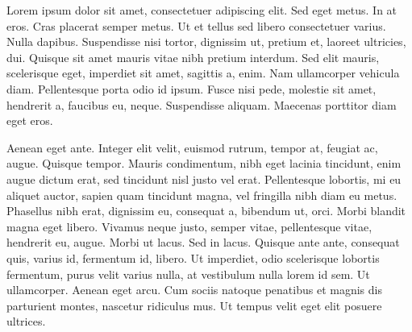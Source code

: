 \documentclass[a4paper,draft]{article}
\begin{document}
\nocite{test-booklet}
Lorem ipsum dolor sit amet, consectetuer adipiscing elit.
Sed eget metus. In at eros. Cras placerat semper metus.
Ut et tellus sed libero consectetuer varius. Nulla dapibus.
Suspendisse nisi tortor, dignissim ut, pretium et, laoreet
ultricies, dui. Quisque sit amet mauris vitae nibh pretium
interdum. Sed elit mauris, scelerisque eget, imperdiet sit
amet, sagittis a, enim. Nam ullamcorper vehicula diam.
Pellentesque porta odio id ipsum. Fusce nisi pede, molestie
sit amet, hendrerit a, faucibus eu, neque. Suspendisse
aliquam. \cite{viktorov-metodoj}
Maecenas porttitor diam eget eros. 

Aenean eget ante. Integer elit velit, euismod rutrum, tempor
at, feugiat ac, augue. Quisque tempor. Mauris condimentum,
nibh eget lacinia tincidunt, enim augue dictum erat, sed
tincidunt nisl justo vel erat. Pellentesque lobortis, mi eu
aliquet auctor, sapien quam tincidunt magna, vel fringilla
nibh diam eu metus. Phasellus nibh erat, dignissim eu,
consequat a, bibendum ut, orci. Morbi blandit magna eget
libero. \cite{ruckenstein-diffusion} Vivamus neque justo, semper vitae, pellentesque
vitae, hendrerit eu, augue. Morbi ut lacus. Sed in lacus.
Quisque ante ante, consequat quis, varius id, fermentum id,
libero. Ut imperdiet, odio scelerisque lobortis fermentum,
purus velit varius nulla, at vestibulum nulla lorem id sem.
Ut ullamcorper. Aenean eget arcu. Cum sociis natoque penatibus
et magnis dis parturient montes, nascetur ridiculus mus.
\cite{test-inbook}
Ut tempus velit eget elit posuere ultrices. \cite{viktorov-metodoj}


\end{document}
